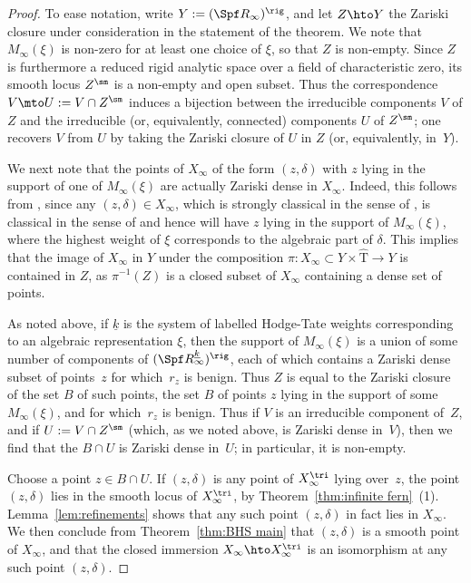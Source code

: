 \begin{proof}
To ease notation, write $Y := (\Spf R_{\infty})^{\rig}$,
and let $Z \hto Y$ the Zariski closure under consideration in the
statement of the theorem.
We note that $M_{\infty}(\xi)$ is non-zero for at least one choice of $\xi$,
so that $Z$ is non-empty.
Since $Z$ is furthermore a reduced rigid analytic space over a field
of characteristic zero, its smooth locus $Z^{\sm}$ is a non-empty and open subset.
Thus the correspondence $V \mto U := V \cap Z^{\sm}$
induces a bijection between the irreducible components $V$ of $Z$
and the irreducible (or, equivalently, connected) components $U$ of $Z^{\sm}$; one recovers $V$ from
$U$ by taking the Zariski closure of $U$ in $Z$ (or, equivalently, in~$Y$).

We next note that the points of $X_{\infty}$ of the form $(z,\delta)$
with $z$ lying in the support of one of $M_{\infty}(\xi)$
are actually Zariski dense
in $X_{\infty}$. Indeed,
this follows from \cite[Th.\,3.19]{BHS},
since any $(z,\delta)\in X_{\infty}$, which is strongly classical in the sense of \cite[Def.\,3.15]{BHS}, is classical
in the sense of \cite[Def.\,3.17]{BHS} and hence will have $z$ lying in the support of $M_{\infty}(\xi)$, where the highest weight of $\xi$ corresponds to the algebraic part of $\delta$.
This implies that the image of $X_{\infty}$ in $Y$ under the composition $\pi: X_{\infty}\subset Y\times \widehat{\mathrm{T}} \to Y$ is contained in $Z$, as $\pi^{-1}(Z)$ is a closed subset of $X_{\infty}$ containing a dense set of points.

As noted above,
if $\underline{k}$ is the system of labelled
Hodge-Tate weights corresponding to an algebraic representation $\xi$,
then the support of $M_{\infty}(\xi)$
is a union of some number of components of
$(\Spf R_{\infty}^{\underline{k}})^{\rig}$,
each of which contains a Zariski dense subset of points~$z$ for which~$r_z$ is benign. Thus $Z$ is equal to the Zariski
closure of the set $B$ of such points, \ie
the set $B$ of points $z$ lying in the support of some $M_{\infty}(\xi)$,
and for which~$r_z$ is benign.
Thus if $V$ is an irreducible component of~$Z$,
and if $U := V \cap Z^{\sm}$ (which, as we noted above, is Zariski
dense in~$V$),
then we find that the $B \cap U$ is Zariski dense in~$U$; in particular,
it is non-empty.

Choose a point $z \in B \cap U$.
If $(z,\delta)$ is any point of $X^{\tri}_{\infty}$
lying over~$z$,
the point $(z,\delta)$ lies in the smooth
locus of $X^{\tri}_{\infty}$, by Theorem~\ref{thm:infinite fern}~(1).
Lemma~\ref{lem:refinements} shows
that any such point $(z,\delta)$
in fact lies in $X_{\infty}$.
We then conclude from
Theorem~\ref{thm:BHS main}
that $(z,\delta)$ is a smooth point of $X_{\infty}$, and that the closed
immersion
$X_{\infty} \hto X^{\tri}_{\infty}$ is an isomorphism
at any such point $(z,\delta)$.


\end{proof}
